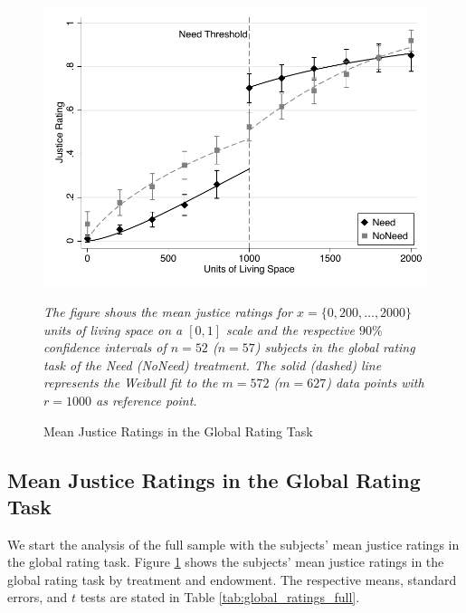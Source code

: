 \documentclass[12pt]{scrartcl}
\begin{document}
\begin{figure}[ht!]
   \centering
   \includegraphics{figures/figure_1.pdf}
   \begin{minipage}{\linewidth}
      \footnotesize
      \textit{The figure shows the mean justice ratings for $x=\{0,200,\ldots,2000\}$ units of living space on a $[0,1]$ scale and the respective $90\%$ confidence intervals of $n=52$ ($n=57$) subjects in the global rating task of the Need (NoNeed) treatment. The solid (dashed) line represents the Weibull fit to the $m=572$ ($m=627$) data points with $r=1000$ as reference point.}
   \end{minipage}
   \caption{Mean Justice Ratings in the Global Rating Task}
   \label{fig:global_ratings_full}
\end{figure}


\subsection{Mean Justice Ratings in the Global Rating Task}\label{sec:global}
We start the analysis of the full sample with the subjects' mean justice ratings in the global rating task.
Figure \ref{fig:global_ratings_full} shows the subjects' mean justice ratings in the global rating task by treatment and endowment.
The respective means, standard errors, and $t$ tests are stated in Table \ref{tab:global_ratings_full}.
\end{document}
